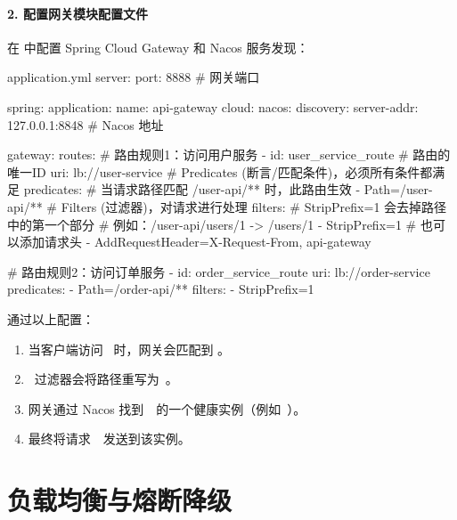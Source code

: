 \paragraph{2. 配置网关模块配置文件}
在  中配置 Spring Cloud Gateway 和 Nacos 服务发现：
\begin{codeblock}[yml]{application.yml}
server:
  port: 8888 # 网关端口

spring:
  application:
    name: api-gateway
  cloud:
    nacos:
      discovery:
        server-addr: 127.0.0.1:8848 # Nacos 地址

    gateway:
      routes:
        # 路由规则1：访问用户服务
        - id: user_service_route # 路由的唯一ID
          uri: lb://user-service 
          # Predicates (断言/匹配条件)，必须所有条件都满足
          predicates:
            # 当请求路径匹配 /user-api/** 时，此路由生效
            - Path=/user-api/**
          # Filters (过滤器)，对请求进行处理
          filters:
            # StripPrefix=1 会去掉路径中的第一个部分
            # 例如：/user-api/users/1 -> /users/1
            - StripPrefix=1
            # 也可以添加请求头
            - AddRequestHeader=X-Request-From, api-gateway

        # 路由规则2：访问订单服务
        - id: order_service_route
          uri: lb://order-service
          predicates:
            - Path=/order-api/**
          filters:
            - StripPrefix=1
\end{codeblock}

通过以上配置：
\begin{enumerate}
    \item 当客户端访问  时，网关会匹配到 。
    \item {} 过滤器会将路径重写为 。
    \item 网关通过 Nacos 找到  的一个健康实例（例如 ）。
    \item 最终将请求  发送到该实例。
\end{enumerate}



\section{负载均衡与熔断降级}

